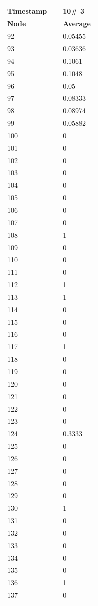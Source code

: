 \begin{tabular}{|l||l|}
\hline
\textbf{Timestamp =} & \textbf{10}\# 3\\\hline
	\textbf{Node} & \textbf{Average} \\ \hline
\hline
	92 & 0.05455 \\ \hline
	93 & 0.03636 \\ \hline
	94 & 0.1061 \\ \hline
	95 & 0.1048 \\ \hline
	96 & 0.05 \\ \hline
	97 & 0.08333 \\ \hline
	98 & 0.08974 \\ \hline
	99 & 0.05882 \\ \hline
	100 & 0 \\ \hline
	101 & 0 \\ \hline
	102 & 0 \\ \hline
	103 & 0 \\ \hline
	104 & 0 \\ \hline
	105 & 0 \\ \hline
	106 & 0 \\ \hline
	107 & 0 \\ \hline
	108 & 1 \\ \hline
	109 & 0 \\ \hline
	110 & 0 \\ \hline
	111 & 0 \\ \hline
	112 & 1 \\ \hline
	113 & 1 \\ \hline
	114 & 0 \\ \hline
	115 & 0 \\ \hline
	116 & 0 \\ \hline
	117 & 1 \\ \hline
	118 & 0 \\ \hline
	119 & 0 \\ \hline
	120 & 0 \\ \hline
	121 & 0 \\ \hline
	122 & 0 \\ \hline
	123 & 0 \\ \hline
	124 & 0.3333 \\ \hline
	125 & 0 \\ \hline
	126 & 0 \\ \hline
	127 & 0 \\ \hline
	128 & 0 \\ \hline
	129 & 0 \\ \hline
	130 & 1 \\ \hline
	131 & 0 \\ \hline
	132 & 0 \\ \hline
	133 & 0 \\ \hline
	134 & 0 \\ \hline
	135 & 0 \\ \hline
	136 & 1 \\ \hline
	137 & 0 \\ \hline
\end{tabular}

